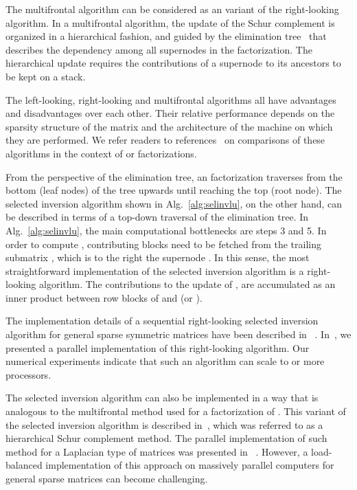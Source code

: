 \documentclass[10pt, conference, compsocconf,letterpaper,twocolumn]{IEEEtran}
\begin{document}
The multifrontal algorithm can be considered as an variant of the 
right-looking algorithm. In a multifrontal algorithm, the update
of the Schur complement is organized in a hierarchical fashion, 
and guided by the elimination tree~\cite{Liu1990} that describes
the dependency among all supernodes in the  factorization.  
The hierarchical update requires the contributions of a supernode 
to its ancestors to be kept on a stack.  


The left-looking, right-looking and multifrontal algorithms all have
advantages and disadvantages over each other. Their relative 
performance depends on the sparsity structure of the matrix 
and the architecture of the machine on which they are performed.
We refer readers to references~\cite{RothbergGupta1993} on comparisons of these algorithms
in the context of  or  factorizations.

From the perspective of the elimination tree, an 
 factorization traverses from the bottom (leaf nodes) of the tree upwards until reaching the top (root node).  
The selected inversion algorithm shown in 
Alg.~\ref{alg:selinvlu}, on the other hand, can be described in terms 
of a top-down traversal of the elimination tree.
In Alg.~\ref{alg:selinvlu}, the main computational
bottlenecks are steps 3 and 5. In order to compute ,
contributing blocks need to be fetched from the trailing submatrix 
, which is to the right the supernode . 
In this sense, the most straightforward implementation of 
the selected inversion algorithm is a right-looking algorithm.
The contributions to the update of , are 
accumulated as an inner product between row blocks of  
and  (or ). 


The implementation details of a sequential right-looking 
selected inversion algorithm for general sparse symmetric
matrices have been described in ~\cite{LinYangMezaEtAl2011}.
In~\cite{JacquelinLinYang2015,JacquelinLinWichmannEtAl2015},
we presented a parallel implementation of this right-looking algorithm. Our numerical experiments indicate 
that such an algorithm can scale to  or more processors. 

The selected inversion algorithm can also be implemented in a way
that is analogous to the multifrontal method used for a  factorization
of .  This variant of the selected inversion algorithm is described
in~\cite{LinLuYingCarE2009}, which was referred to as a hierarchical 
Schur complement method. The parallel implementation 
of such method for a Laplacian type of matrices was presented in
~\cite{LinYangLuEtAl2011}. However, a load-balanced
implementation of this approach on massively parallel computers for general sparse matrices can become challenging.
\end{document}
